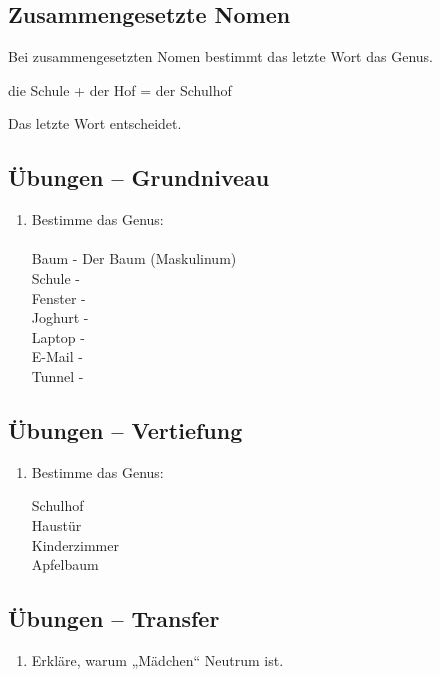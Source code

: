 \documentclass[a4paper,12pt]{article}
\begin{document}
\newpage
\subsection*{Zusammengesetzte Nomen}

Bei zusammengesetzten Nomen bestimmt das letzte Wort das Genus.

die Schule + der Hof = der Schulhof  

\begin{merksatz}
Das letzte Wort entscheidet.
\end{merksatz}

\subsection*{Übungen – Grundniveau}

\begin{enumerate}
\item Bestimme das Genus:\\\\
Baum - Der Baum (Maskulinum)\\
Schule - \\
Fenster - \\
Joghurt - \\
Laptop - \\
E-Mail - \\
Tunnel - \\
\end{enumerate}

\subsection*{Übungen – Vertiefung}

\begin{enumerate}
\item Bestimme das Genus:

Schulhof\\
Haustür\\
Kinderzimmer\\
Apfelbaum
\end{enumerate}

\subsection*{Übungen – Transfer}

\begin{enumerate}
\item Erkläre, warum „Mädchen“ Neutrum ist.
\end{enumerate}
\newpage
\end{document}
